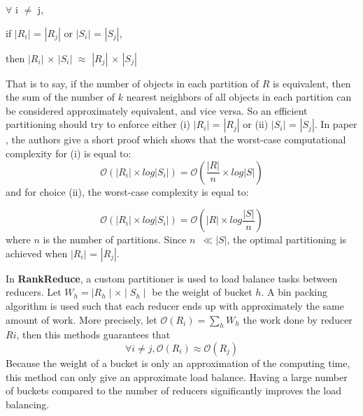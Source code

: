 \documentclass[10pt,journal,compsoc]{IEEEtran}
\newcommand{\LSH}{{\bf RankReduce}}
\begin{document}
\begin{center}
$\forall$ i $\neq$ j, 

if $\left| R_i \right|$ = $\left| R_j \right|$ or $\left| S_i \right|$ = $\left| S_j \right|$, 

then $\left| R_i \right|$ $\times$ $\left| S_i \right|$ $\approx$ $\left| R_j \right|$ $\times$ $\left| S_j \right|$
\end{center} 
That is to say, if the number of objects in each partition of $R$ is equivalent, then the sum of 
the number of $k$ nearest neighbors of all objects in each partition can be considered 
approximately equivalent, and vice versa.
So an efficient partitioning should try to enforce either (i) $\left| R_i \right|$ = $\left| R_j 
\right|$ or (ii) $\left| S_i \right|$ = $\left| S_j 
\right|$.
In paper \cite{Zhang:2012:EPK:2247596.2247602}, the authors give a short proof which 
shows that the worst-case computational complexity for (i) is equal to:
\begin{equation}
\mathcal{O}\left(\left|R_i\right| \times log\left|S_i\right|\right) = \mathcal{O}\left(\frac{\left|R\right|}{n} \times log\left|S\right|\right) \label{eq:complexity1}
\end{equation}
and for choice (ii), the worst-case complexity is equal to:

\begin{equation}
\mathcal{O}\left(\left|R_i\right| \times log\left|S_i\right|\right) = \mathcal{O}\left(\left|R\right|\times log\frac{\left|S\right|}{n}\right) \label{eq:complexity2}
\end{equation}
where $n$ is the number of partitions. Since $n$~$\ll \left|S\right|$, the 
optimal partitioning is achieved when $\left| R_i \right|$ = $\left| R_j \right|$.

In \LSH, a custom partitioner is used to load balance tasks between reducers. Let $W_{h}=\mid R_{h} \mid \times \mid S_{h} \mid$ be the weight of bucket $h$. A bin packing algorithm is used such that each reducer ends up 
with approximately the same amount of work. More precisely, let $\mathcal{O}\left(R_i\right)  = \sum_{h}{W_{h}}$ the
work done by reducer $R{i}$, then this methods guarantees that 
\begin{equation}
\forall i \neq j, \mathcal{O}\left(R_i\right)  \approx  \mathcal{O}\left(R_j\right)
\end{equation}
Because the weight of a bucket is only an approximation of the computing time, this method can only give an
approximate load balance. Having a large number of buckets compared to the number of reducers significantly improves
the load balancing.   
\end{document}
